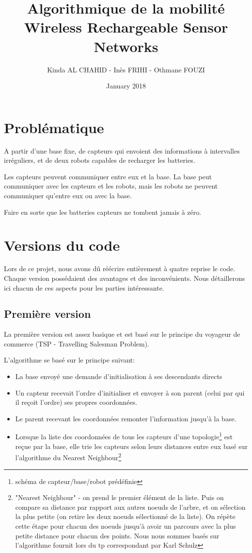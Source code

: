 \documentclass{article}
\title{Algorithmique de la mobilité \\ Wireless Rechargeable Sensor Networks}
\author{Kinda AL CHAHID - Inès FRIHI - Othmane FOUZI}
\date{January 2018}
\begin{document}
\maketitle

\section{Problématique}
A partir d'une base fixe, de capteurs qui envoient des informations à intervalles irréguliers, et de deux robots capables de recharger les batteries.

Les capteurs peuvent communiquer entre eux et la base. La base peut communiquer avec les capteurs et les robots, mais les robots ne peuvent communiquer qu'entre eux ou avec la base.

Faire en sorte que les batteries capteurs ne tombent jamais à zéro.

\section{Versions du code}
Lors de ce projet, nous avons dû réécrire entièrement à quatre reprise le code. Chaque version possédaient des avantages et des inconvénients. Nous détaillerons ici chacun de ces aspects pour les parties intéressante.
\subsection{Première version}
La première version est assez basique et est basé sur le principe du voyageur de commerce (TSP - Travelling Salesman Problem\cite{TSP}).

L'algorithme se basé sur le principe suivant:
\begin{itemize}
    \item La base envoyé une demande d'initialisation à ses descendants directs
    \item Un capteur recevait l'ordre d'initialiser et envoyer à son parent (celui par qui il reçoit l'ordre) ses propres coordonnées.
    \item Le parent recevant les coordonnées remonter l'information jusqu'à la base.
    \item Lorsque la liste des coordonnées de tous les capteurs d'une topologie\footnote{schéma de capteur/base/robot prédéfinie} est reçue par la base, elle trie les capteurs selon leurs distances entre eux basé sur l'algorithme du Nearest Neighbour\footnote{"Nearest Neighbour" - on prend le premier élément de la liste. Puis on compare sa distance par rapport aux autres noeuds de l'arbre, et on sélection la plus petite (on retire les deux noeuds sélectionné de la liste). On répète cette étape pour chacun des noeuds jusqu'à avoir un parcours avec la plus petite distance pour chacun des points. Nous nous sommes basés sur l'algorithme fournit lors du tp correspondant par Karl Schulz}
\end{itemize}
\end{document}
